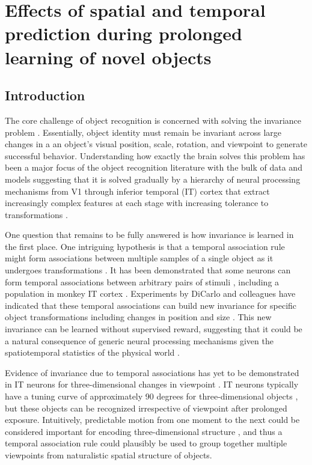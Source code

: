 \documentclass[dwyatte_dissertation.tex]{subfiles}
\begin{document}
\sloppy

\chapter{Effects of spatial and temporal prediction during prolonged learning of novel objects}
\label{chap:bpleast}

\section{Introduction}
The core challenge of object recognition is concerned with solving the invariance problem \cite{DicarloZoccolanRust12}. Essentially, object identity must remain be invariant across large changes in a an object's visual position, scale, rotation, and viewpoint to generate successful behavior. Understanding how exactly the brain solves this problem has been a major focus of the object recognition literature with the bulk of data and models suggesting that it is solved gradually by a hierarchy of neural processing mechanisms from V1 through inferior temporal (IT) cortex that extract increasingly complex features at each stage with increasing tolerance to transformations \cite{RiesenhuberPoggio99,SerreOlivaPoggio07,OReillyWyatteHerdEtAl13}.

One question that remains to be fully answered is how invariance is learned in the first place. One intriguing hypothesis is that a temporal association rule might form associations between multiple samples of a single object as it undergoes transformations \cite{StringerPerryRollsEtAl06,WallisBaddeley97,IsikLeiboPoggio12}. It has been demonstrated that some neurons can form temporal associations between arbitrary pairs of stimuli \cite{SakaiMiyashita91}, including a population in monkey IT cortex \cite{MeyerOlson11}. Experiments by DiCarlo and colleagues have indicated that these temporal associations can build new invariance for specific object transformations including changes in position and size \cite{CoxMeierOerteltEtAl05,LiDiCarlo08,LiDiCarlo10}. This new invariance can be learned without supervised reward, suggesting that it could be a natural consequence of generic neural processing mechanisms given the spatiotemporal statistics of the physical world \cite{LiDiCarlo12}.

Evidence of invariance due to temporal associations has yet to be demonstrated in IT neurons for three-dimensional changes in viewpoint \cite[although see][for relevant human behavioral work]{WallisBulthoff01,WallisBackusLangerEtAl09}. IT neurons typically have a tuning curve of approximately 90 degrees for three-dimensional objects \cite{LogothetisPaulsBulthoffEtAl94,LogothetisPaulsPoggio95}, but these objects can be recognized irrespective of viewpoint after prolonged exposure\cite{WallisBulthoff99,EdelmanBulthoff92,TarrGauthier98}. Intuitively, predictable motion from one moment to the next could be considered important for encoding three-dimensional structure \cite{LawsonHumphreysWatson94,Stone98,VuongTarr04,BalasSinha09b,BalasSinha09c,ChuangVuongBulthoff12}, and thus a temporal association rule could plausibly be used to group together multiple viewpoints from naturalistic spatial structure of objects.
\end{document}
